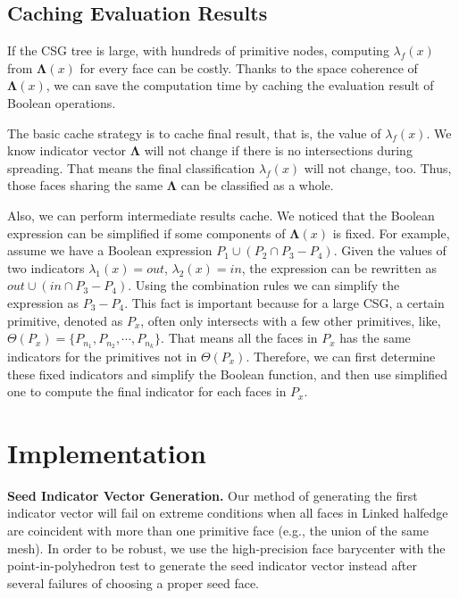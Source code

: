 \documentclass[10pt,journal,compsoc]{IEEEtran}
\begin{document}
\subsection{Caching Evaluation Results}

If the CSG tree is large, with hundreds of primitive nodes, computing $\lambda_f(x)$ from $\boldsymbol{\Lambda}(x)$ for every face can be costly. Thanks to the space coherence of $\boldsymbol{\Lambda}(x)$, we can save the computation time by caching the evaluation result of Boolean operations.

The basic cache strategy is to cache final result, that is, the value of $\lambda_f(x)$. We know indicator vector $\boldsymbol{\Lambda}$ will not change if there is no intersections during spreading. That means the final classification $\lambda_f(x)$ will not change, too. Thus, those faces sharing the same $\boldsymbol{\Lambda}$ can be classified as a whole.

Also, we can perform intermediate results cache. We noticed that the Boolean expression can be simplified if some components of $\boldsymbol{\Lambda}(x)$ is fixed. For example, assume we have a Boolean expression $P_1\cup (P_2\cap P_3-P_4)$. Given the values of two indicators $\lambda_1(x)=out$, $\lambda_2(x)=in$, the expression can be rewritten as $out\cup (in\cap P_3-P_4)$. Using the combination rules we can simplify the expression as $P_3-P_4$. This fact is important because for a large CSG, a certain primitive, denoted as $P_x$, often only intersects with a few other primitives, like, $\Theta(P_x)= \{P_{n_1}, P_{n_2}, \cdots, P_{n_k}\}$. That means all the faces in $P_x$ has the same indicators for the primitives not in $\Theta(P_x)$. Therefore, we can first determine these fixed indicators and simplify the Boolean function, and then use simplified one to compute the final indicator for each faces in $P_x$.


\section{Implementation}

\vspace{0.5em}
\textbf{Seed Indicator Vector Generation.} Our method of generating the first indicator vector will fail on extreme conditions when all faces in Linked halfedge are coincident with more than one primitive face (e.g., the union of the same mesh). In order to be robust, we use the high-precision face barycenter with the point-in-polyhedron test to generate the seed indicator vector instead after several failures of choosing a proper seed face.
\end{document}
